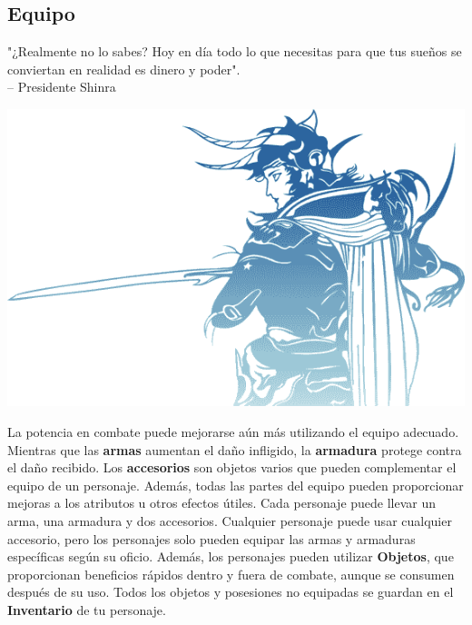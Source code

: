 \subsection*{Equipo}
%
"¿Realmente no lo sabes? Hoy en día todo lo que necesitas para que tus sueños se conviertan en realidad es dinero y poder".\\   
\indent -- Presidente Shinra
%
\vfill
%
\begin{center} \includegraphics[width=\columnwidth]{./art/images/ff1.png} \end{center}
%
La potencia en combate puede mejorarse aún más utilizando el \hypertarget{equip}{equipo} adecuado. Mientras que las \textbf{armas }aumentan el daño infligido, la \textbf{armadura} protege contra el daño recibido. Los \textbf{accesorios} son objetos varios que pueden complementar el equipo de un personaje. Además, todas las partes del equipo pueden proporcionar mejoras a los atributos u otros efectos útiles. Cada personaje puede llevar un arma, una armadura y dos accesorios. Cualquier personaje puede usar cualquier accesorio, pero los personajes solo pueden equipar las armas y armaduras específicas según su oficio. Además, los personajes pueden utilizar \textbf{Objetos}, que proporcionan beneficios rápidos dentro y fuera de combate, aunque se consumen después de su uso. Todos los objetos y posesiones no equipadas se guardan en el \textbf{Inventario} de tu personaje.
%
\vspace{0.5cm}
%
